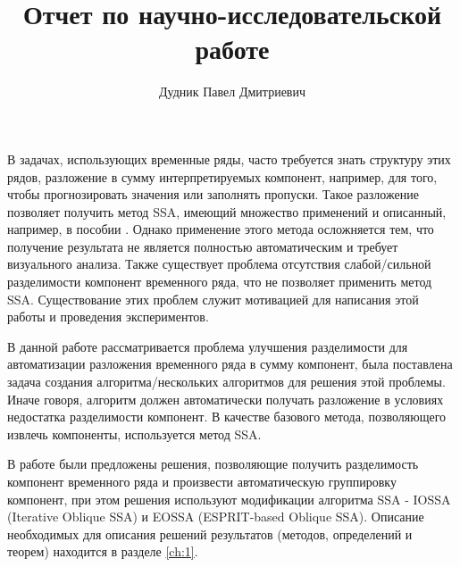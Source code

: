 \documentclass[specialist, substylefile = spbureport.rtx, subf,href,colorlinks=true, 12pt]{disser}
\theoremstyle{definition}
\begin{document}
%
%

\title{Отчет по научно-исследовательской работе}


\author{Дудник Павел Дмитриевич}


\date{\number\year}

\maketitle

\tableofcontents

\intro
В задачах, использующих временные ряды, часто требуется знать структуру этих рядов, разложение в сумму интерпретируемых компонент, например, для того, чтобы прогнозировать значения или заполнять пропуски. Такое разложение позволяет получить метод SSA, имеющий множество применений и описанный, например, в пособии \cite{Golyandina04}. Однако применение этого метода осложняется тем, что получение результата не является полностью автоматическим и требует визуального анализа. Также существует проблема отсутствия слабой/сильной разделимости компонент временного ряда, что не позволяет применить метод SSA. Существование этих проблем служит мотивацией для написания этой работы и проведения экспериментов.

В данной работе рассматривается проблема улучшения разделимости для автоматизации разложения временного ряда в сумму компонент, была поставлена задача создания алгоритма/нескольких алгоритмов для решения этой проблемы. Иначе говоря, алгоритм должен автоматически получать разложение в условиях недостатка разделимости компонент. В качестве базового метода, позволяющего извлечь компоненты, используется метод SSA.

В работе были предложены решения, позволяющие получить разделимость компонент временного ряда и произвести автоматическую группировку компонент, при этом решения используют модификации алгоритма SSA - IOSSA (Iterative Oblique SSA) и EOSSA (ESPRIT-based Oblique SSA). Описание необходимых для описания решений результатов (методов, определений и теорем) находится в разделе \ref{ch:1}.
\end{document}
